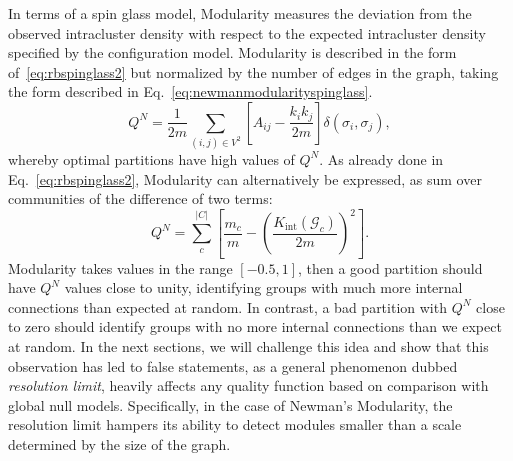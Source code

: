 In terms of a spin glass model, Modularity measures the deviation from the observed intracluster density with respect to the expected intracluster density specified by the configuration model. Modularity is described in the form of~\ref{eq:rbspinglass2} but normalized by the number of edges in the graph, taking the form described in Eq.~\ref{eq:newmanmodularityspinglass}.
\begin{equation}\label{eq:newmanmodularityspinglass}
Q^N =  \frac{1}{2m} \sum_{ (i,j) \in V^2} \left[ A_{ij} - \frac{k_i k_j}{2m} \right] \delta(\sigma_i,\sigma_j),
\end{equation}
whereby optimal partitions have high values of $Q^N$. As already done in Eq.~\ref{eq:rbspinglass2}, Modularity can alternatively be expressed, as sum over communities of the difference of two terms:
\begin{equation}\label{eq:newmanmodularity}
Q^N = \sum_{c}^{|C|} \left[ \frac{m_c}{m} - \left( \frac{K_{\textrm{int}}(\mathcal{G}_c)}{2m} \right)^2 \right].
\end{equation}
Modularity takes values in the range $[-0.5,1]$, then a good partition should have $Q^N$ values close to unity, identifying groups with much more internal connections than expected at random. In contrast, a bad partition with $Q^N$ close to zero should identify groups with no more internal connections than we expect at random.
In the next sections, we will challenge this idea and show that this observation has led to false statements, as a general phenomenon dubbed \emph{resolution limit}, heavily affects any quality function based on comparison with global null models.
Specifically, in the case of Newman's Modularity, the resolution limit hampers its ability to detect modules smaller than a scale determined by the size of the graph.

